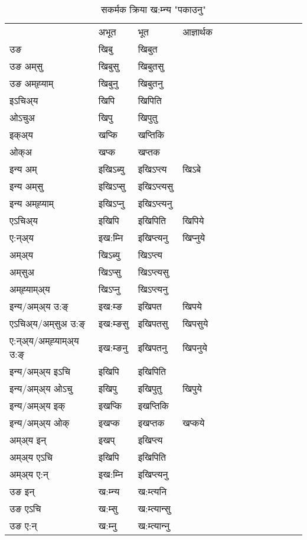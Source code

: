 \begin{table}[H]
\centering
\caption{\label{ip.vt} सकर्मक क्रिया  ख:म्‍न्य  "पकाउनु"  }
\begin{tabular}{l|l|l|l|l|l|l|l|l|l|l|l|l}  \toprule
&अभूत & भूत & आज्ञार्थक \\ 
उङ &खिबु &खिबुत \\ 
उङ अम्‌सु &खिबुसु &खिबुतसु \\ 
उङ अम्‌ह्‍याम् &खिबुनु &खिबुतनु \\ 
इऽचिअ्य &खिपि &खिपिति   \\ 
ओऽचुअ &खिपु &खिपुतु   \\ 
इक्अ्य &खप्कि &खप्‍तिकि   \\ 
ओक्अ &खप्क &खप्‍तक   \\ 
इन्य अम् & इखिऽब्यु  & इखिऽप्‍त्य &खिऽबे  \\ 
इन्य अम्‌सु & इखिऽप्सु  & इखिऽप्‍त्यसु   \\ 
इन्य अम्‌ह्‍याम् & इखिऽप्‍नु  & इखिऽप्‍त्यनु   \\ 
एऽचिअ्य & इखिपि & इखिपिति &खिपिये    \\ 
ए:न्अ्य & इख:म्‍नि  & इखिप्‍त्यनु &खिप्‍नुये  \\ 
अम्अ्य & खिऽब्यु  & खिऽप्‍त्य  \\ 
अम्‌सुअ & खिऽप्सु & खिऽप्‍त्यसु  \\ 
अम्‌ह्‍याम्अ्य & खिऽप्‍नु  & खिऽप्‍त्यनु \\ 
\midrule
इन्य/अम्अ्य उ:ङ्‌&इख:म्ङ & इखिपत &खिपये \\ 
एऽचिअ्य/अम्‌सुअ उ:ङ्‌ &इख:म्ङसु & इखिपतसु &खिपसुये \\ 
ए:न्अ्य/अम्‌ह्‍याम्अ्य उ:ङ्‌ &इख:म्ङनु & इखिपतनु &खिपनुये \\ 
इन्य/अम्अ्य इऽचि & इखिपि & इखिपिति    \\ 
इन्य/अम्अ्य ओऽचु & इखिपु & इखिपुतु  &खिपुये  \\ 
इन्य/अम्अ्य इक् & इखप्कि & इखप्‍तिकि   \\ 
इन्य/अम्अ्य ओक् & इखप्क & इखप्‍तक  &खप्कये  \\ 
अम्अ्य इन् & इखप् & इखिप्‍त्य   \\ 
अम्अ्य एऽचि & इखिपि & इखिपिति    \\ 
अम्अ्य ए:न् & इख:म्‍नि  & इखिप्‍त्यनु  \\ 
\midrule
उङ इन् & ख:म्‍न्य  & ख:म्त्यनि  \\ 
उङ एऽचि & ख:म्सु  & ख:म्त्यान्सु   \\ 
उङ ए:न्& ख:म्‍नु  & ख:म्त्यान्‍नु   \\ 
\bottomrule
\end{tabular}
\end{table}


